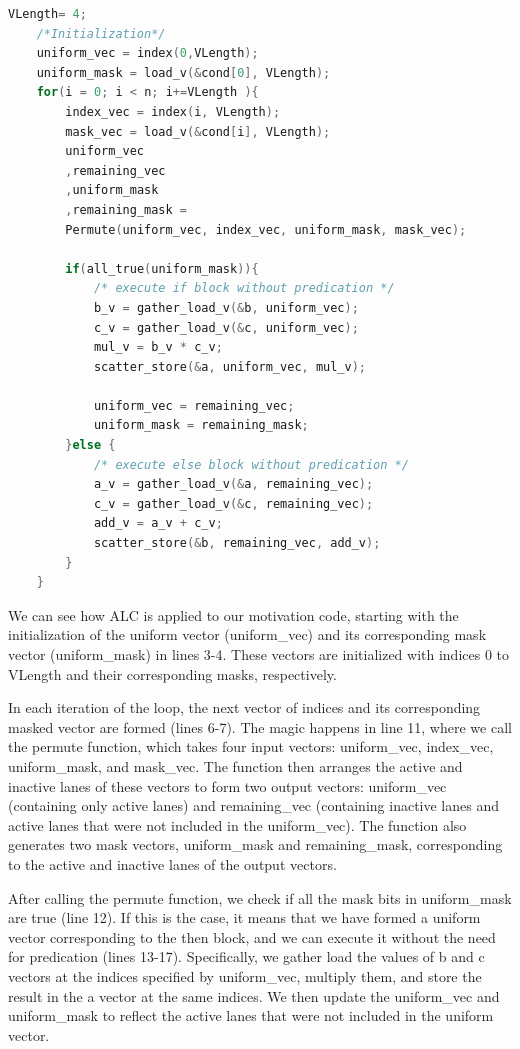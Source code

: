 \documentclass[\main/thesis.tex]{subfiles}
\begin{document}
\begin{lstlisting}[language=C]
    VLength= 4;
    /*Initialization*/
    uniform_vec = index(0,VLength);
    uniform_mask = load_v(&cond[0], VLength);
    for(i = 0; i < n; i+=VLength ){
        index_vec = index(i, VLength);
        mask_vec = load_v(&cond[i], VLength);
        uniform_vec 
        ,remaining_vec
        ,uniform_mask
        ,remaining_mask =
        Permute(uniform_vec, index_vec, uniform_mask, mask_vec); 
                
        if(all_true(uniform_mask)){
            /* execute if block without predication */
            b_v = gather_load_v(&b, uniform_vec);
            c_v = gather_load_v(&c, uniform_vec);
            mul_v = b_v * c_v;
            scatter_store(&a, uniform_vec, mul_v);

            uniform_vec = remaining_vec;
            uniform_mask = remaining_mask;
        }else {     
            /* execute else block without predication */
            a_v = gather_load_v(&a, remaining_vec);
            c_v = gather_load_v(&c, remaining_vec);
            add_v = a_v + c_v;
            scatter_store(&b, remaining_vec, add_v);
        } 
    }
\end{lstlisting}

We can see how ALC is applied to our motivation code, starting with the initialization of the uniform vector (uniform\_vec) and its corresponding mask vector (uniform\_mask) in lines 3-4. These vectors are initialized with indices 0 to VLength and their corresponding masks, respectively.

In each iteration of the loop, the next vector of indices and its corresponding masked vector are formed (lines 6-7). The magic happens in line 11, where we call the permute function, which takes four input vectors: uniform\_vec, index\_vec, uniform\_mask, and mask\_vec. The function then arranges the active and inactive lanes of these vectors to form two output vectors: uniform\_vec (containing only active lanes) and remaining\_vec (containing inactive lanes and active lanes that were not included in the uniform\_vec). The function also generates two mask vectors, uniform\_mask and remaining\_mask, corresponding to the active and inactive lanes of the output vectors.

After calling the permute function, we check if all the mask bits in uniform\_mask are true (line 12). If this is the case, it means that we have formed a uniform vector corresponding to the then block, and we can execute it without the need for predication (lines 13-17). Specifically, we gather load the values of b and c vectors at the indices specified by uniform\_vec, multiply them, and store the result in the a vector at the same indices. We then update the uniform\_vec and uniform\_mask to reflect the active lanes that were not included in the uniform vector.
\end{document}
